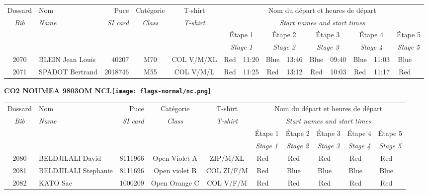 \documentclass{report}
\begin{document}
  \begin{longtable}{|c|l|r|c|c|*{5}{cc|}}
    Dossard & Nom  & Puce    & Catégorie & T-shirt & \multicolumn{10}{c|}{Nom du départ et heures de départ} \\
    \itshape Bib     & \itshape Name & \itshape SI card & \itshape Class  & \itshape  T-shirt  & \multicolumn{10}{c|}{\itshape Start names and start times} \\
    \hline
    & & & & & \multicolumn{2}{c|}{Étape 1} & \multicolumn{2}{c|}{Étape 2} & \multicolumn{2}{c|}{Étape 3} & \multicolumn{2}{c|}{Étape 4} & \multicolumn{2}{c|}{Étape 5} \\
    & & & & & \multicolumn{2}{c|}{\itshape Stage 1} & \multicolumn{2}{c|}{\itshape Stage 2} & \multicolumn{2}{c|}{\itshape Stage 3} & \multicolumn{2}{c|}{\itshape Stage 4} & \multicolumn{2}{c|}{\itshape Stage 5} \\
    \hline
    2070 & BLEIN Jean Louis & 40207 & M70 & COL V/M/XL & Red & 11:20 & Blue & 13:46 & Blue & 09:40 & Blue & 11:03 & Blue &  \\
    2071 & SPADOT Bertrand & 2018746 & M55 & COL V/M/L & Red & 11:25 & Red & 13:12 & Red & 10:03 & Red & 11:17 & Red &  \\
  \end{longtable}
\newpage
  \Huge \centering \bfseries CO2 NOUMEA 9803OM NCL\normalfont \footnotesize \sffamily \hfill \texttt{[image: flags-normal/nc.png]} \newline 
  \begin{longtable}{|c|l|r|c|c|*{5}{cc|}}
    Dossard & Nom  & Puce    & Catégorie & T-shirt & \multicolumn{10}{c|}{Nom du départ et heures de départ} \\
    \itshape Bib     & \itshape Name & \itshape SI card & \itshape Class  & \itshape  T-shirt  & \multicolumn{10}{c|}{\itshape Start names and start times} \\
    \hline
    & & & & & \multicolumn{2}{c|}{Étape 1} & \multicolumn{2}{c|}{Étape 2} & \multicolumn{2}{c|}{Étape 3} & \multicolumn{2}{c|}{Étape 4} & \multicolumn{2}{c|}{Étape 5} \\
    & & & & & \multicolumn{2}{c|}{\itshape Stage 1} & \multicolumn{2}{c|}{\itshape Stage 2} & \multicolumn{2}{c|}{\itshape Stage 3} & \multicolumn{2}{c|}{\itshape Stage 4} & \multicolumn{2}{c|}{\itshape Stage 5} \\
    \hline
    2080 & BELDJILALI David & 8111966 & Open Violet A & ZIP/M/XL & Red &   & Red &   & Red &   & Red &   & Red &  \\
    2081 & BELDJILALI Stephanie & 8111696 & Open violet B & COL ZI/F/M & Red &   & Blue &   & Blue &   & Blue &   & Blue &  \\
    2082 & KATO Sae & 1000209 & Open Orange C & COL V/F/M & Red &   & Red &   & Red &   & Red &   & Red &  \\
  \end{longtable}
\end{document}
